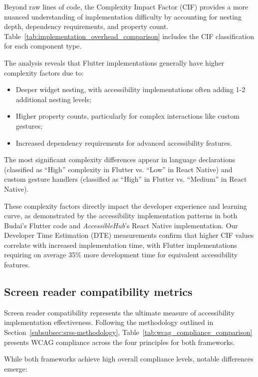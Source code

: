 Beyond raw lines of code, the Complexity Impact Factor (CIF) provides a more nuanced understanding of implementation difficulty by accounting for nesting depth, dependency requirements, and property count. Table~\ref{tab:implementation_overhead_comparison} includes the CIF classification for each component type.

The analysis reveals that Flutter implementations generally have higher complexity factors due to:

\begin{itemize}
    \item Deeper widget nesting, with accessibility implementations often adding 1-2 additional nesting levels;
    \item Higher property counts, particularly for complex interactions like custom gestures;
    \item Increased dependency requirements for advanced accessibility features.
\end{itemize}

The most significant complexity differences appear in language declarations (classified as ``High'' complexity in Flutter vs. ``Low'' in React Native) and custom gesture handlers (classified as ``High'' in Flutter vs. ``Medium'' in React Native).

These complexity factors directly impact the developer experience and learning curve, as demonstrated by the accessibility implementation patterns in both Budai's Flutter code and \textit{AccessibleHub}'s React Native implementation. Our Developer Time Estimation (DTE) measurements confirm that higher CIF values correlate with increased implementation time, with Flutter implementations requiring on average 35\% more development time for equivalent accessibility features.

\subsection{Screen reader compatibility metrics}
\label{subsec:screen-reader-metrics}

Screen reader compatibility represents the ultimate measure of accessibility implementation effectiveness. Following the methodology outlined in Section~\ref{subsubsec:srss-methodology}, Table~\ref{tab:wcag_compliance_comparison} presents WCAG compliance across the four principles for both frameworks.

While both frameworks achieve high overall compliance levels, notable differences emerge:

